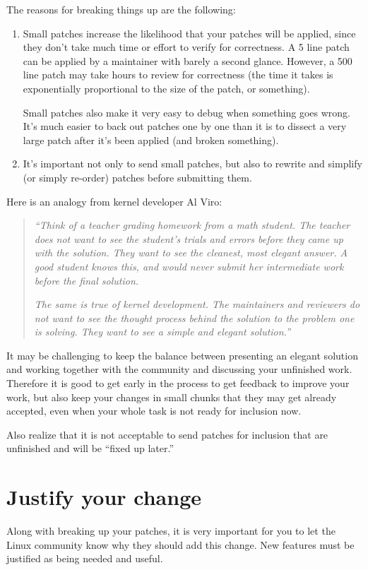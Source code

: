 \documentclass[a4paper,8pt,english]{sphinxmanual}
\begin{document}
The reasons for breaking things up are the following:
\begin{enumerate}
\item {} 
Small patches increase the likelihood that your patches will be
applied, since they don't take much time or effort to verify for
correctness.  A 5 line patch can be applied by a maintainer with
barely a second glance. However, a 500 line patch may take hours to
review for correctness (the time it takes is exponentially
proportional to the size of the patch, or something).

Small patches also make it very easy to debug when something goes
wrong.  It's much easier to back out patches one by one than it is
to dissect a very large patch after it's been applied (and broken
something).

\item {} 
It's important not only to send small patches, but also to rewrite
and simplify (or simply re-order) patches before submitting them.

\end{enumerate}

Here is an analogy from kernel developer Al Viro:
\begin{quote}

\emph{``Think of a teacher grading homework from a math student.  The
teacher does not want to see the student's trials and errors
before they came up with the solution. They want to see the
cleanest, most elegant answer.  A good student knows this, and
would never submit her intermediate work before the final
solution.}

\emph{The same is true of kernel development. The maintainers and
reviewers do not want to see the thought process behind the
solution to the problem one is solving. They want to see a
simple and elegant solution.''}
\end{quote}

It may be challenging to keep the balance between presenting an elegant
solution and working together with the community and discussing your
unfinished work. Therefore it is good to get early in the process to
get feedback to improve your work, but also keep your changes in small
chunks that they may get already accepted, even when your whole task is
not ready for inclusion now.

Also realize that it is not acceptable to send patches for inclusion
that are unfinished and will be ``fixed up later.''


\section{Justify your change}
\label{process/howto:justify-your-change}
Along with breaking up your patches, it is very important for you to let
the Linux community know why they should add this change.  New features
must be justified as being needed and useful.
\end{document}
